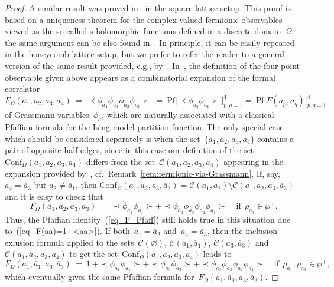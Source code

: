 \documentclass[reqno,11pt,a4paper]{amsart}
\theoremstyle{remark}
\newcommand{\F}{F_\Omega}       \newcommand{\Fdelta}{F_{\Omega_\delta}}
\newcommand{\conf}{\mathrm{Conf}}
\newcommand\CorrFerm[2]{\prec\! #2 \!\succ_{#1}{}}
\newcommand\ConfO[1]{\conf_\Omega(#1)}
\begin{document}
\begin{proof}
A similar result was proved in~\cite[Proposition~84]{Hon10} in the square lattice setup. This proof is based on a uniqueness theorem for the complex-valued fermionic observables viewed as the so-called s-holomorphic functions defined in a discrete domain~$\Omega$; the same argument can be also found in~\cite[Section~3.5]{CheIzy13}. In principle, it can be easily repeated in the honeycomb lattice setup, but we prefer to refer the reader to a general version of the same result provided, e.g., by~\cite[Theorem~1.2]{CheCimKas15}. In~\cite{CheCimKas15}, the definition of the four-point observable given above appears as a combinatorial expansion of the formal correlator
\begin{equation}
\label{eq_F_Pfaff}
\F(a_1,a_2,a_3,a_4)~=~\CorrFerm{}{\phi_{a_4}\phi_{a_3}\phi_{a_2}\phi_{a_1}}~=~ \mathrm{Pf}\big[\!\!\CorrFerm{}{\phi_{a_q}\phi_{a_p}}\!\!\big]_{p,q=1}^4 =~\mathrm{Pf}\big[F(a_p,a_q)\big]_{p,q=1}^4
\end{equation}
of Grassmann variables~$\phi_a$, which are naturally associated with a classical Pfaffian formula for the Ising model partition function. The only special case which should be considered separately is when the set~$\{a_1,a_2,a_3,a_4\}$ contains a pair of opposite half-edges, since in this case our definition of the set~$\ConfO{a_1,a_2,a_3,a_4}$ differs from the set~$\mathcal{C}(a_1,a_2,a_3,a_4)$ appearing in the expansion provided by~\cite[Theorem~1.2]{CheCimKas15}, cf.~Remark~\ref{rem:fermionic-via-Grassmann}. If, say,~$a_4=\overline{a}_3$ but $a_2\ne\overline{a}_1$, then $\ConfO{a_1,a_2,a_3,\overline{a}_3}=\mathcal{C}(a_1,a_2)\setminus\mathcal{C}(a_1,a_2,a_3,\overline{a}_3)$
and it is easy to check that
\[%
\F(a_1,a_2,a_3,\overline{a}_3)~=~\CorrFerm{}{\phi_{a_2}\phi_{a_1}} + \CorrFerm{}{\phi_{\overline{a}_3}\phi_{a_3}\phi_{a_2}\phi_{a_1}}\quad \text{if}\ \ \rho_{a_3}\in\wp^+.
\]
Thus, the Pfaffian identity~(\ref{eq_F_Pfaff}) still holds true in this situation due to~(\ref{eq_F(aa)=1+<aa>}). If both~\mbox{$a_1=\overline{a}_2$} and~$a_4=\overline{a}_3$, then the inclusion-exlusion formula applied to the sets~$\mathcal{C}(\varnothing)$, $\mathcal{C}(a_1,\overline{a}_1)$, $\mathcal{C}(a_3,\overline{a}_3)$ and~$\mathcal{C}(a_1,a_2,a_3,a_4)$ to get the set~$\ConfO{a_1,a_2,a_3,a_4}$ leads to
\[
\F(a_1,\overline{a}_1,a_3,\overline{a}_3)~=~1~+\CorrFerm{}{\phi_{\overline{a}_1}\phi_{a_1}} + \CorrFerm{}{\phi_{\overline{a}_3}\phi_{a_3}} + \CorrFerm{}{\phi_{\overline{a}_3}\phi_{a_3}\phi_{\overline{a}_1}\phi_{a_1}}\quad \text{if}\ \  \rho_{a_1},\rho_{a_3}\in\wp^+,
\]
which eventually gives the same Pfaffian formula for~$\F(a_1,\overline{a}_1,a_3,\overline{a}_3)$.
\end{proof}
\end{document}
